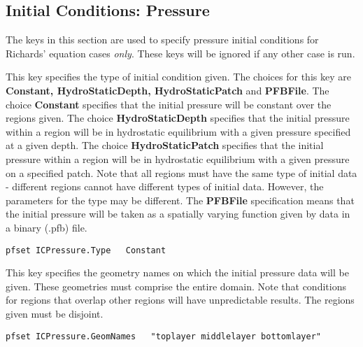 
\subsection{Initial Conditions: Pressure}
\label{Initial Conditions: Pressure}

The keys in this section are used to specify pressure initial conditions for 
Richards' equation cases {\em only}.  These keys will be ignored if any other
case is run.

{This key specifies the type of initial condition given.  The choices for this
key are {\bf Constant, HydroStaticDepth, HydroStaticPatch} and {\bf PFBFile}.
The choice {\bf Constant} specifies that the initial pressure will be constant
over the regions given.  The choice {\bf HydroStaticDepth} specifies that the
initial pressure within a region 
will be in hydrostatic equilibrium with a given pressure
specified at a given depth.  The choice {\bf HydroStaticPatch} specifies that
the initial pressure within a region 
will be in hydrostatic equilibrium with a given pressure on a specified patch.
Note that all regions must have the same type of initial data - different
regions cannot have different types of initial data.  However, the parameters
for the type may be different.
The {\bf PFBFile} specification means that the initial pressure 
will be taken as a spatially varying function given by data in a
\parflow{} binary (.pfb) file.  
}
\begin{display}\begin{verbatim}
pfset ICPressure.Type   Constant
\end{verbatim}\end{display}

{This key specifies the geometry names on which the initial pressure data will
be given.  These geometries must comprise the entire domain.
Note that conditions for regions that overlap other regions will have
unpredictable results.  The regions given must be disjoint.
}
\begin{display}\begin{verbatim}
pfset ICPressure.GeomNames   "toplayer middlelayer bottomlayer"
\end{verbatim}\end{display}

